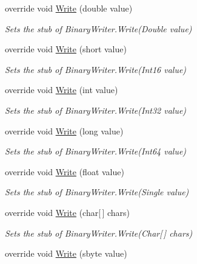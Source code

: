 \begin{DoxyCompactItemize}
override void \hyperlink{class_system_1_1_i_o_1_1_fakes_1_1_stub_binary_writer_a3ce5fb8c512dadb3c2ddb39778126486}{Write} (double value)
\begin{DoxyCompactList}\small\item\em Sets the stub of Binary\-Writer.\-Write(\-Double value)\end{DoxyCompactList}\item 
override void \hyperlink{class_system_1_1_i_o_1_1_fakes_1_1_stub_binary_writer_a5d89a4c4a464c54e539c585668bec708}{Write} (short value)
\begin{DoxyCompactList}\small\item\em Sets the stub of Binary\-Writer.\-Write(\-Int16 value)\end{DoxyCompactList}\item 
override void \hyperlink{class_system_1_1_i_o_1_1_fakes_1_1_stub_binary_writer_af95826440ec45cad9a44e9f9f4f30623}{Write} (int value)
\begin{DoxyCompactList}\small\item\em Sets the stub of Binary\-Writer.\-Write(\-Int32 value)\end{DoxyCompactList}\item 
override void \hyperlink{class_system_1_1_i_o_1_1_fakes_1_1_stub_binary_writer_a3c584983816577026109b898814bf024}{Write} (long value)
\begin{DoxyCompactList}\small\item\em Sets the stub of Binary\-Writer.\-Write(\-Int64 value)\end{DoxyCompactList}\item 
override void \hyperlink{class_system_1_1_i_o_1_1_fakes_1_1_stub_binary_writer_a4755884f8cad50c93eeaa8400ee6c985}{Write} (float value)
\begin{DoxyCompactList}\small\item\em Sets the stub of Binary\-Writer.\-Write(\-Single value)\end{DoxyCompactList}\item 
override void \hyperlink{class_system_1_1_i_o_1_1_fakes_1_1_stub_binary_writer_affa7132cade040f5dcc5619494e71c67}{Write} (char\mbox{[}$\,$\mbox{]} chars)
\begin{DoxyCompactList}\small\item\em Sets the stub of Binary\-Writer.\-Write(\-Char\mbox{[}$\,$\mbox{]} chars)\end{DoxyCompactList}\item 
override void \hyperlink{class_system_1_1_i_o_1_1_fakes_1_1_stub_binary_writer_af7800ce00e225b5cc819d4c1557da94b}{Write} (sbyte value)

\end{DoxyCompactItemize}
